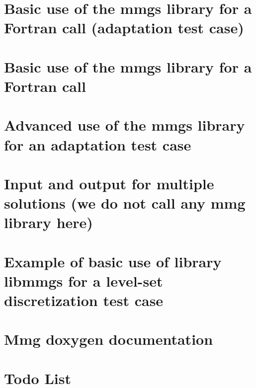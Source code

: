 \documentclass[twoside]{book}
\newcommand{\+}{\discretionary{\mbox{\scriptsize$\hookleftarrow$}}{}{}}
\begin{document}
\chapter{Basic use of the mmgs library for a Fortran call (adaptation test case)}
\label{md_libexamples_mmgs_adaptation_example0_fortran_example0_a_README}

\chapter{Basic use of the mmgs library for a Fortran call}
\label{md_libexamples_mmgs_adaptation_example0_fortran_README}

\chapter{Advanced use of the mmgs library for an adaptation test case}
\label{md_libexamples_mmgs_adaptation_example1_README}

\chapter{Input and output for multiple solutions (we do not call any mmg library here)}
\label{md_libexamples_mmgs_io_multisols_example3_README}

\chapter{Example of basic use of library libmmgs for a level-\/set discretization test case}
\label{md_libexamples_mmgs_IsosurfDiscretization_example0_README}

\chapter{Mmg doxygen documentation}
\label{md_doc_doxygen_BUILD_DOXYGEN_DOC}

\chapter{Todo List}
\label{todo}

\end{document}
